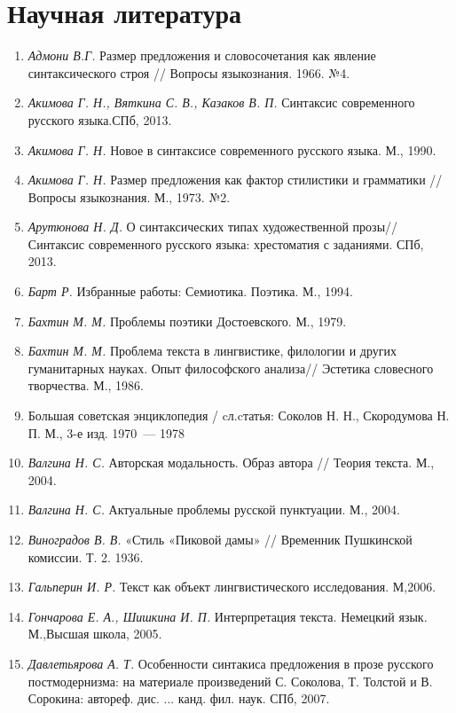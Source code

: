     \section*{Научная литература}
      \begin{enumerate}
        \item \textit{Адмони В.Г.} Размер предложения и словосочетания как явление синтаксического строя // Вопросы языкознания.  1966. №4. 
        \item \textit{Акимова Г. Н., Вяткина С. В., Казаков В. П.} Синтаксис современного русского языка.СПб, 2013. 
        \item \textit{Акимова Г. Н.} Новое в синтаксисе современного русского языка. М., 1990.
        \item \textit{Акимова Г. Н.} Размер предложения как фактор стилистики и грамматики // Вопросы языкознания. М., 1973. №2.
        \item \textit{Арутюнова Н. Д.} О синтаксических типах художественной прозы// Синтаксис современного русского языка: хрестоматия с заданиями. СПб, 2013.
        \item \textit{Барт Р.} Избранные работы: Семиотика. Поэтика. М., 1994.
        \item \textit{Бахтин М. М.} Проблемы поэтики Достоевского. М., 1979.
        \item \textit{Бахтин М. М.} Проблема текста в лингвистике, филологии и других гуманитарных науках. Опыт философского анализа// Эстетика словесного творчества. М., 1986.  
        \item Большая советская энциклопедия / cл.cтатья: Соколов Н. Н., Скородумова Н. П. М., 3-е изд. 1970~--- 1978
        \item \textit{Валгина Н. С.} Авторская модальность. Образ автора // Теория текста. М., 2004. 
        \item \textit{Валгина Н. С.} Актуальные проблемы русской пунктуации. М., 2004.
        \item \textit{Виноградов В. В.} «Стиль «Пиковой дамы» // Временник Пушкинской комиссии. Т. 2. 1936. 
        \item \textit{Гальперин И. Р.} Текст как объект лингвистического исследования. М,2006. 
        \item \textit{Гончарова Е. А., Шишкина И. П. }Интерпретация текста. Немецкий язык. М.,Высшая школа, 2005.
        \item \textit{Давлетьярова А. Т.} Особенности синтакиса предложения в прозе русского постмодернизма: на материале произведений С. Соколова, Т. Толстой и В. Сорокина: автореф. дис. ... канд. фил. наук. СПб, 2007.

\end{enumerate}
